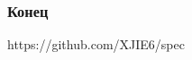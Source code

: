 \documentclass[demo]{beamer}
\begin{document}
\begin{frame}[fragile]
\begin{columns}
\begin{column}{0.3\textwidth}
\begin{lstlisting}
\end{lstlisting}
\end{column}
\end{columns}
\end{frame}

\begin{frame}\frametitle{Конец}
https://github.com/XJIE6/spec
\end{frame}
\end{document}
